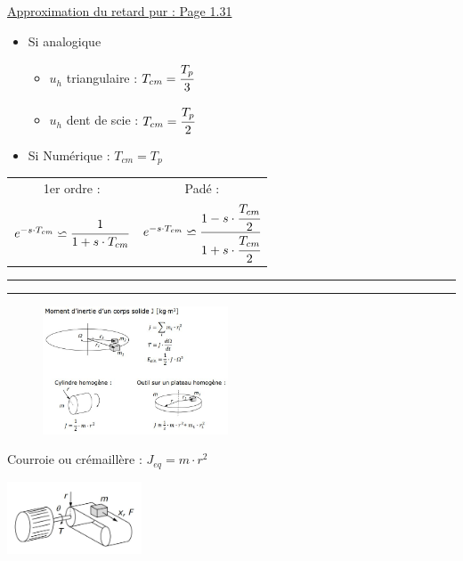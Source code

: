 \documentclass[	DIV=calc,%
							paper=a4,%
							fontsize=10pt,%
							twocolumn]{scrartcl} %
\newcommand{\hformbar}[1]{\bigskip \hrule \vspace{1pt} \hrule \vspace{5pt}} %
\newcounter{mycounter}
\newcommand{\formdesc}[1]{\large\textbf{#1} \addtocounter{mycounter}{1} \hfill \themycounter \\ \vspace{-3mm} \hrule \vspace{2mm}}
\newcommand{\formtitle}[1]{\large\underline{#1}}
\begin{document}
\formtitle{Approximation du retard pur : Page 1.31}
\begin{itemize}
    \item Si analogique 
        \begin{itemize}
            \item $u_h$ triangulaire : $T_{cm} = \cfrac{T_p}{3} $
            \item $u_h$ dent de scie : $T_{cm} = \cfrac{T_p}{2} $
        \end{itemize}
    \item Si Numérique : $T_{cm} = T_p $
\end{itemize}



\begin{table}[H]
    \begin{tabular}{c | c}
        1er ordre : & Padé : \\
        {\hfill $ e^{-s\cdot T_{cm}} \backsimeq \cfrac{1}{1 + s\cdot T_{cm}} $\hfill} & {\hfill $ e^{-s\cdot T_{cm}} \backsimeq \cfrac{1 - s \cdot \cfrac{T_{cm}}{2}}{1 + s \cdot \cfrac{T_{cm}}{2}} $\hfill}
    \end{tabular}
\end{table}


\hformbar


\formdesc{Rappel sur le moment d’inertie : Page 1.32}

\begin{figure}[H]
    \begin{center}      
        \includegraphics[width = 0.49\textwidth]{img/Rappel_inertie1.JPG}
    \end{center}
\end{figure}

Courroie ou crémaillère : $J_{eq} = m \cdot r^2$                                         

{\centering \includegraphics[width = 0.3\textwidth]{img/Cremaillere.JPG}}
\end{document}
